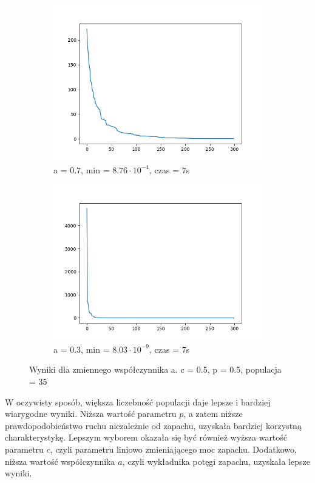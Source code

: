 \documentclass[12pt]{article}
\begin{document}
\begin{figure}[H]
    \centering
    \begin{subfigure}{0.49\textwidth}
        \centering
        \includegraphics[width=\linewidth]{plots/BOA/8_best.png}
        \caption{a = 0.7, min = $8.76\cdot 10^{-4}$, czas = 7s}
    \end{subfigure}
    \begin{subfigure}{0.49\textwidth}
        \centering
        \includegraphics[width=\linewidth]{plots/BOA/9_best.png}
        \caption{a = 0.3, min = $8.03\cdot 10^{-9}$, czas = 7s}
    \end{subfigure}
    \caption{Wyniki dla zmiennego współczynnika a. c = 0.5, p = 0.5, populacja = 35}
\end{figure}
W oczywisty sposób, większa liczebność populacji daje lepsze i bardziej wiarygodne wyniki. Niższa wartość parametru $p$, a zatem niższe prawdopodobieństwo ruchu niezależnie od zapachu, uzyskała bardziej korzystną charakterystykę. Lepszym wyborem okazała się być również wyższa wartość parametru $c$, czyli parametru liniowo zmieniającego moc zapachu. Dodatkowo, niższa wartość współczynnika $a$, czyli wykładnika potęgi zapachu, uzyskała lepsze wyniki.
 
\end{document}

